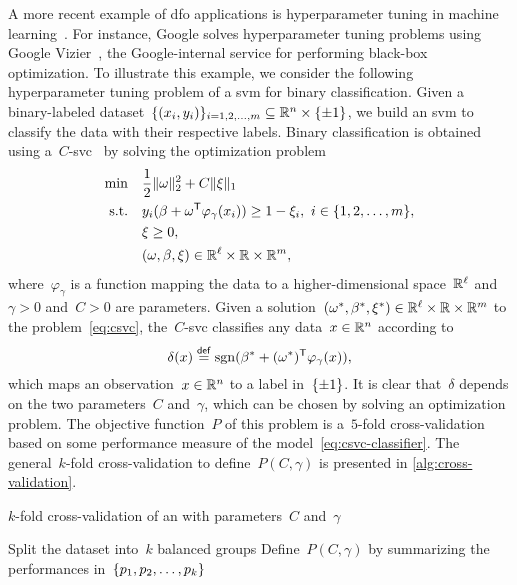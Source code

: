 A more recent example of \gls{dfo} applications is hyperparameter tuning in machine learning~\cite{Ghanbari_Scheinberg_2017}.
For instance, Google solves hyperparameter tuning problems using Google Vizier~\cite{Golovin_Etal_2017}, the Google-internal service for performing black-box optimization.
To illustrate this example, we consider the following hyperparameter tuning problem of a \gls{svm} for binary classification.
Given a binary-labeled dataset~$\set{(\iter_i, y_i)}_{i = 1, 2, \dots, m} \subseteq \R^n \times \set{\pm 1}$, we build an \gls{svm} to classify the data with their respective labels.
Binary classification is obtained using a~$C$-\gls{svc}~\cite{Chang_Lin_2011} by solving the optimization problem
\begin{subequations}
    \label{eq:csvc}
    \begin{align}
        \min        & \quad \frac{1}{2} \norm{\omega}_2^2 + C \norm{\xi}_1\\
        \text{s.t.} & \quad y_i (\beta + \omega^{\T} \varphi_{\gamma}(\iter_i)) \ge 1 - \xi_i, ~ i \in \set{1, 2, \dots, m},\\
                    & \quad \xi \ge 0,\\
                    & \quad (\omega, \beta, \xi) \in \R^{\ell} \times \R \times \R^m,
    \end{align}
\end{subequations}
where~$\varphi_{\gamma}$ is a function mapping the data to a higher-dimensional space~$\mathbb{R}^{\ell}$ and~$\gamma > 0$ and~$C > 0$ are parameters.
Given a solution~$(\omega^{\ast}, \beta^{\ast}, \xi^{\ast}) \in \mathbb{R}^{\ell} \times \mathbb{R} \times \mathbb{R}^m$ to the problem~\cref{eq:csvc}, the~$C$-\gls{svc} classifies any data~$\iter \in \R^n$ according to
\begin{equation}
    \label{eq:csvc-classifier}
    \delta(\iter) \eqdef \sgn(\beta^{\ast} + (\omega^{\ast})^{\T} \varphi_{\gamma}(\iter)),
\end{equation}
which maps an observation~$\iter \in \R^n$ to a label in~$\{\pm 1\}$.
It is clear that~$\delta$ depends on the two parameters~$C$ and~$\gamma$, which can be chosen by solving an optimization problem.
The objective function~$P$ of this problem is a~$5$-fold cross-validation based on some performance measure of the model~\cref{eq:csvc-classifier}.
The general~$k$-fold cross-validation to define~$P(C, \gamma)$ is presented in \cref{alg:cross-validation}.

\begin{algorithm}
    \caption{$k$-fold cross-validation of an  with parameters~$C$ and~$\gamma$}
    \label{alg:cross-validation}
    \DontPrintSemicolon
    Split the dataset into~$k$ balanced groups\;
    Define~$P(C, \gamma)$ by summarizing the performances in~$\{p_1, p_2, \dots, p_k\}$\;
\end{algorithm}

